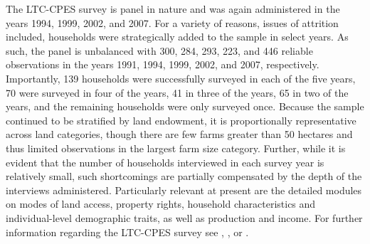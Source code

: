 \documentclass[english]{article}
\begin{document}
The LTC-CPES survey is panel in nature and was again administered in the 
years 1994, 1999, 2002, and 2007. 
For a variety of reasons, issues of attrition included, households were 
strategically added to the sample in select years.
As such, the panel is unbalanced with 300, 284, 293, 223, and 446 reliable 
observations in the years 1991, 1994, 1999, 2002, and 2007, respectively. 
Importantly, 139 households were successfully surveyed in each of the five 
years, 70 were surveyed in four of the years, 41 in three of the years, 65 in two 
of the years, and the remaining households were only surveyed once. 
Because the sample continued to be stratified by land endowment, it is 
proportionally representative across land categories, though there are few
farms greater than 50 hectares and thus limited observations in the largest 
farm size category.
Further, while it is evident that the number of households interviewed in 
each survey year is relatively small, such shortcomings are partially 
compensated by the depth of the interviews administered. 
Particularly relevant at present are the detailed modules on modes of land 
access, property rights, household characteristics and individual-level 
demographic traits, as well as production and income. 
For further information regarding the LTC-CPES survey see 
\citet{fletschner2002}, \citet{carter2003}, or \citet{schechter2007}.
\end{document}
